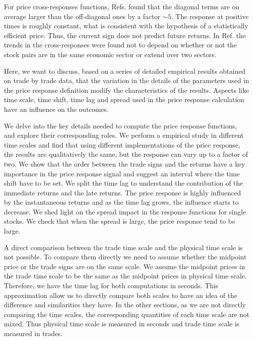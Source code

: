 For price cross-responses functions, Refs.
\cite{dissecting_cross,Wang_2016_cross} found that the diagonal terms are on
average larger than the off-diagonal ones by a factor $\sim 5$. The response at
positive times is roughly constant, what is consistent with the hypothesis of a
statistically efficient price. Thus, the current sign does not predict future
returns. In Ref. \cite{Wang_2016_cross} the trends in the cross-responses were
found not to depend on whether or not the stock pairs are in the same economic
sector or extend over two sectors.


Here, we want to discuss, based on a series of detailed empirical results
obtained on trade by trade data, that the variation in the details of the
parameters used in the price response definition modify the characteristics of
the results. Aspects like time scale, time shift, time lag and spread used in
the price response calculation have an influence on the outcomes.

We delve into the key details needed to compute the price response functions,
and explore their corresponding roles. We perform a empirical study in
different time scales and find that using different implementations of the
price response, the results are qualitatively the same, but the response can
vary up to a factor of two. We show that the order between the trade signs and
the returns have a key importance in the price response signal and suggest an
interval where the time shift have to be set. We split the time lag to
understand the contribution of the immediate returns and the late returns. The
price response is highly influenced by the instantaneous returns and as the
time lag grows, the influence starts to decrease. We shed light on the spread
impact in the response functions for single stocks. We check that when the
spread is large, the price response tend to be large.

A direct comparison between the trade time scale and the physical time scale is
not possible. To compare them directly we need to assume whether the midpoint
price or the trade signs are on the same scale. We assume the midpoint prices
in the trade time scale to be the same as the midpoint prices in physical time
scale. Therefore, we have the time lag for both computations in seconds. This
approximation allow us to directly compare both scales to have an idea of the
difference and similarities they have. In the other sections, as we are not
directly comparing the time scales, the corresponding quantities of each time
scale are not mixed. Thus physical time scale is measured in seconds and trade
time scale is measured in trades.

